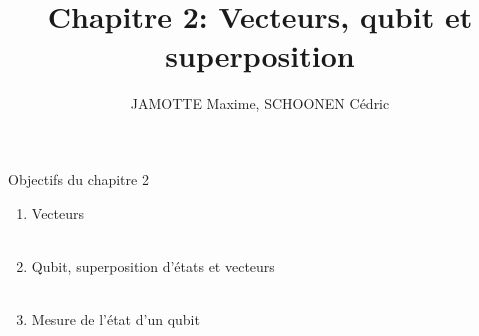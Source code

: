 \documentclass[aspectratio=169,12pt]{beamer}
\begin{document}
\title[Chapter 2]{Chapitre 2: Vecteurs, qubit et superposition}
\author{JAMOTTE Maxime, SCHOONEN Cédric}
\date{}

\begin{frame}
  \titlepage
\end{frame}

\begin{frame}{Objectifs du chapitre 2}
  \begin{enumerate}
    \item Vecteurs\\~\\
    \item Qubit, superposition d'états et vecteurs\\~\\
    \item Mesure de l'état d'un qubit
  \end{enumerate}
\end{frame}
\end{document}
